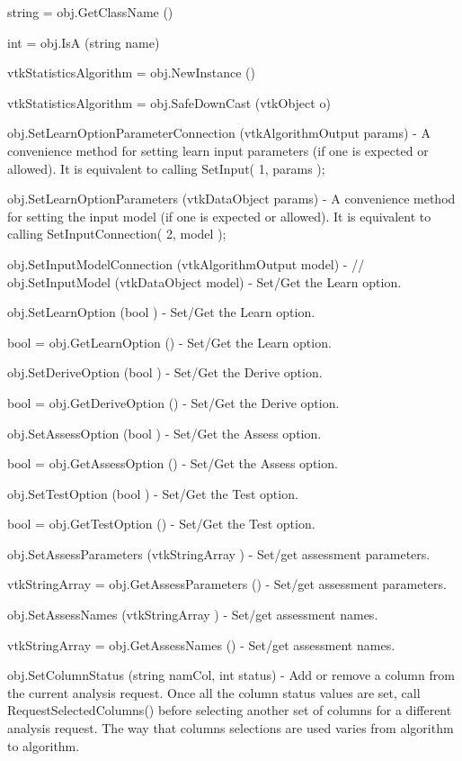 \begin{DoxyItemize}
\item {\ttfamily string = obj.\-Get\-Class\-Name ()}  
\item {\ttfamily int = obj.\-Is\-A (string name)}  
\item {\ttfamily vtk\-Statistics\-Algorithm = obj.\-New\-Instance ()}  
\item {\ttfamily vtk\-Statistics\-Algorithm = obj.\-Safe\-Down\-Cast (vtk\-Object o)}  
\item {\ttfamily obj.\-Set\-Learn\-Option\-Parameter\-Connection (vtk\-Algorithm\-Output params)} -\/ A convenience method for setting learn input parameters (if one is expected or allowed). It is equivalent to calling Set\-Input( 1, params );  
\item {\ttfamily obj.\-Set\-Learn\-Option\-Parameters (vtk\-Data\-Object params)} -\/ A convenience method for setting the input model (if one is expected or allowed). It is equivalent to calling Set\-Input\-Connection( 2, model );  
\item {\ttfamily obj.\-Set\-Input\-Model\-Connection (vtk\-Algorithm\-Output model)} -\/ //  {\ttfamily obj.\-Set\-Input\-Model (vtk\-Data\-Object model)} -\/ Set/\-Get the Learn option.  
\item {\ttfamily obj.\-Set\-Learn\-Option (bool )} -\/ Set/\-Get the Learn option.  
\item {\ttfamily bool = obj.\-Get\-Learn\-Option ()} -\/ Set/\-Get the Learn option.  
\item {\ttfamily obj.\-Set\-Derive\-Option (bool )} -\/ Set/\-Get the Derive option.  
\item {\ttfamily bool = obj.\-Get\-Derive\-Option ()} -\/ Set/\-Get the Derive option.  
\item {\ttfamily obj.\-Set\-Assess\-Option (bool )} -\/ Set/\-Get the Assess option.  
\item {\ttfamily bool = obj.\-Get\-Assess\-Option ()} -\/ Set/\-Get the Assess option.  
\item {\ttfamily obj.\-Set\-Test\-Option (bool )} -\/ Set/\-Get the Test option.  
\item {\ttfamily bool = obj.\-Get\-Test\-Option ()} -\/ Set/\-Get the Test option.  
\item {\ttfamily obj.\-Set\-Assess\-Parameters (vtk\-String\-Array )} -\/ Set/get assessment parameters.  
\item {\ttfamily vtk\-String\-Array = obj.\-Get\-Assess\-Parameters ()} -\/ Set/get assessment parameters.  
\item {\ttfamily obj.\-Set\-Assess\-Names (vtk\-String\-Array )} -\/ Set/get assessment names.  
\item {\ttfamily vtk\-String\-Array = obj.\-Get\-Assess\-Names ()} -\/ Set/get assessment names.  
\item {\ttfamily obj.\-Set\-Column\-Status (string nam\-Col, int status)} -\/ Add or remove a column from the current analysis request. Once all the column status values are set, call Request\-Selected\-Columns() before selecting another set of columns for a different analysis request. The way that columns selections are used varies from algorithm to algorithm.


\end{DoxyItemize}

